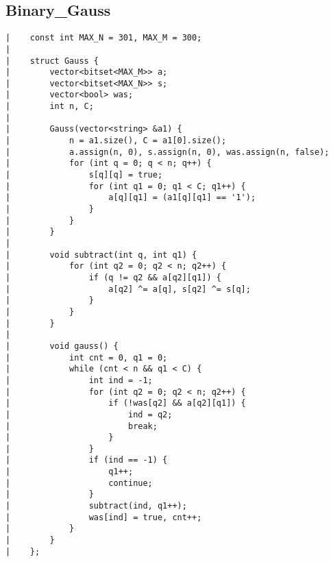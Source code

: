 \documentclass[a4paper, 10pt]{article}
\begin{document}
\begin{center}
\section*{Binary\_Gauss}
\begin{verbatim}
|    const int MAX_N = 301, MAX_M = 300;
|    
|    struct Gauss {
|        vector<bitset<MAX_M>> a;
|        vector<bitset<MAX_N>> s;
|        vector<bool> was;
|        int n, C;
|    
|        Gauss(vector<string> &a1) {
|            n = a1.size(), C = a1[0].size();
|            a.assign(n, 0), s.assign(n, 0), was.assign(n, false);
|            for (int q = 0; q < n; q++) {
|                s[q][q] = true;
|                for (int q1 = 0; q1 < C; q1++) {
|                    a[q][q1] = (a1[q][q1] == '1');
|                }
|            }
|        }
|    
|        void subtract(int q, int q1) {
|            for (int q2 = 0; q2 < n; q2++) {
|                if (q != q2 && a[q2][q1]) {
|                    a[q2] ^= a[q], s[q2] ^= s[q];
|                }
|            }
|        }
|    
|        void gauss() {
|            int cnt = 0, q1 = 0;
|            while (cnt < n && q1 < C) {
|                int ind = -1;
|                for (int q2 = 0; q2 < n; q2++) {
|                    if (!was[q2] && a[q2][q1]) {
|                        ind = q2;
|                        break;
|                    }
|                }
|                if (ind == -1) {
|                    q1++;
|                    continue;
|                }
|                subtract(ind, q1++);
|                was[ind] = true, cnt++;
|            }
|        }
|    };
\end{verbatim}


\end{center}
\end{document}
